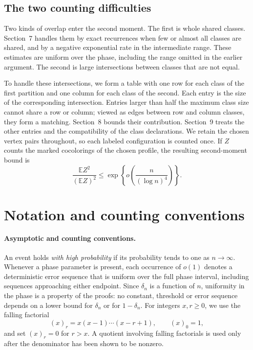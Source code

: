 \documentclass[a4paper,10pt,reqno]{amsart}
\numberwithin{equation}{section}
\theoremstyle{plain}
\theoremstyle{remark}
\begin{document}
\subsection*{The two counting difficulties}

Two kinds of overlap enter the second moment. The first is whole shared
classes. Section~7 handles them by exact recurrences when few or almost
all classes are shared, and by a negative exponential rate in the
intermediate range. These estimates are uniform over the phase, including
the range omitted in the earlier argument. The second is large
intersections between classes that are not equal.

To handle these intersections, we form a table with one row for each class
of the first partition and one column for each class of the second. Each
entry is the size of the corresponding intersection. Entries larger than
half the maximum class size cannot share a row or column; viewed as edges
between row and column classes, they form a matching. Section~8 bounds
their contribution. Section~9 treats the other entries and the compatibility
of the class declarations. We retain the chosen vertex pairs throughout,
so each labeled configuration is counted once. If \(Z\) counts the marked cocolorings of the chosen
profile, the resulting second-moment bound is
\[
 \frac{\mathbb E Z^2}{(\mathbb E Z)^2}
 \le \exp\!\left\{o\!\left(\frac{n}{(\log n)^4}\right)\right\}.
\]

\section*{Notation and counting conventions}
\label{sec:conventions}

\paragraph{Asymptotic and counting conventions.}
An event holds \emph{with high probability} if its
probability tends to one as $n\to\infty$. Whenever a phase parameter is
present, each occurrence of $o(1)$ denotes a deterministic error sequence that
is uniform over the full phase interval, including sequences approaching
either endpoint. Since $\delta_n$ is a function of $n$, uniformity in the
phase is a property of the proofs: no constant, threshold or error sequence
depends on a lower bound for $\delta_n$ or for $1-\delta_n$.
For integers $x,r\ge0$, we use the falling factorial
\[
  (x)_r=x(x-1)\cdots(x-r+1),
  \qquad
  (x)_0=1,
\]
and set $(x)_r=0$ for $r>x$. A quotient involving falling factorials is used
only after the denominator has been shown to be nonzero.
\end{document}
